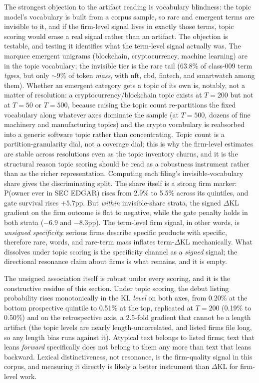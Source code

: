 \documentclass[11pt]{article}
\newcommand{\dkl}{$\Delta$KL}
\begin{document}
The strongest objection to the artifact reading is vocabulary blindness:
the topic model's vocabulary is built from a corpus sample, so rare and
emergent terms are invisible to it, and if the firm-level signal lives in
exactly those terms, topic scoring would erase a real signal rather than
an artifact. The objection is testable, and testing it identifies what
the term-level signal actually was. The marquee emergent unigrams
(blockchain, cryptocurrency, machine learning) are in the topic
vocabulary; the invisible tier is the rare tail (63.8\% of class-009 term
\emph{types}, but only $\sim$9\% of token \emph{mass}, with nft, cbd,
fintech, and smartwatch among them). Whether an emergent category gets a
topic of its own is, notably, not a matter of resolution: a
cryptocurrency/blockchain topic exists at $T = 200$ but not at $T = 50$ or
$T = 500$, because raising the topic count re-partitions the fixed
vocabulary along whatever axes dominate the sample (at $T = 500$, dozens
of fine machinery and manufacturing topics) and the crypto vocabulary is
reabsorbed into a generic software topic rather than concentrating. Topic
count is a partition-granularity dial, not a coverage dial; this is why
the firm-level estimates are stable across resolutions even as the topic
inventory churns, and it is the structural reason topic scoring should be
read as a robustness instrument rather than as the richer representation.
Computing each filing's invisible-vocabulary share gives the
discriminating split. The share itself is a strong firm marker:
P(owner ever in SEC EDGAR) rises from 2.9\% to 5.5\% across its
quintiles, and gate survival rises $+5.7$pp. But \emph{within}
invisible-share strata, the signed \dkl{} gradient on the firm outcome is
flat to negative, while the gate penalty holds in both strata
($-6.9$ and $-8.3$pp). The term-level firm signal, in other words, is
\emph{unsigned specificity}: serious firms describe specific products
with specific, therefore rare, words, and rare-term mass inflates
term-\dkl{} mechanically. What dissolves under topic scoring is the
specificity channel as a \emph{signed} signal; the directional resonance
claim about firms is what remains, and it is empty.

The unsigned association itself is robust under every scoring, and it is
the constructive residue of this section. Under topic scoring, the debut
listing probability rises monotonically in the KL \emph{level} on both
axes, from 0.20\% at the bottom prospective quintile to 0.51\% at the
top, replicated at $T = 200$ (0.19\% to 0.50\%) and on the retrospective
axis, a 2.5-fold gradient that cannot be a length artifact (the topic
levels are nearly length-uncorrelated, and listed firms file long, so
any length bias runs against it). Atypical text belongs to listed firms;
text that leans \emph{forward} specifically does not belong to them any
more than text that leans backward. Lexical distinctiveness, not
resonance, is the firm-quality signal in this corpus, and measuring it
directly is likely a better instrument than \dkl{} for firm-level work.
\end{document}
